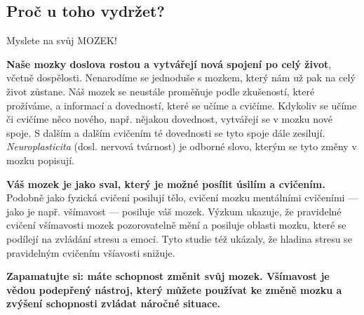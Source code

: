 	\clearpage
	\subsection{Proč u toho vydržet?}

		 Myslete na svůj MOZEK! 

		\textbf{Naše mozky doslova rostou a vytvářejí nová spojení po celý život}, včetně dospělosti. Nenarodíme se jednoduše s mozkem, který nám už pak na celý život zůstane. Náš mozek se neustále proměňuje podle zkušeností, které prožíváme, a informací a dovedností, které se učíme a cvičíme. Kdykoliv se učíme či cvičíme něco nového, např. nějakou dovednost, vytvářejí se v mozku nové spoje. S dalším a dalším cvičením té dovednosti se tyto spoje dále zesilují. \emph{Neuroplasticita} (dosl. nervová tvárnost) je odborné slovo, kterým se tyto změny v mozku popisují.

		 
		\textbf{Váš mozek je jako sval, který je možné posílit úsilím a cvičením.} Podobně jako fyzická cvičení posilují tělo, cvičení mozku mentálními cvičeními — jako je např. všímavost — posiluje váš mozek. Výzkum ukazuje, že pravidelné cvičení všímavosti mozek pozorovatelně mění a posiluje oblasti mozku, které se podílejí na zvládání stresu a emocí. Tyto studie též ukázaly, že hladina stresu se pravidelným cvičením všíavosti snižuje.

		
		\textbf{Zapamatujte si: máte schopnost změnit svůj mozek. Všímavost je vědou podepřený nástroj, který můžete používat ke změně mozku a zvýšení schopnosti zvládat náročné situace.}

\cleardoublepage
